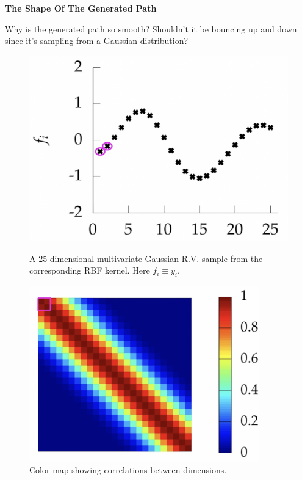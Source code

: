 \documentclass[11pt]{article}
\theoremstyle{plain} %
\theoremstyle{remark}
\begin{document}
\textbf{The Shape Of The Generated Path}

Why is the generated path so smooth? Shouldn't it be bouncing up and down since it's sampling from a Gaussian distribution?

\begin{figure}[!htp]
  \begin{minipage}{0.33\textwidth}
    \centering
    \includegraphics[width=\textwidth]{images/samples.png}
    \caption{A 25 dimensional multivariate Gaussian R.V. sample from the corresponding RBF kernel. Here $f_i\equiv y_i$.}
    \label{fig:sample from RBF kernel}
  \end{minipage}
  \begin{minipage}{0.33\textwidth}
    \centering
    \includegraphics[width=0.89\textwidth]{images/kernel.png}
    \caption{Color map showing correlations between dimensions.}

\end{minipage}
\end{figure}
\end{document}
